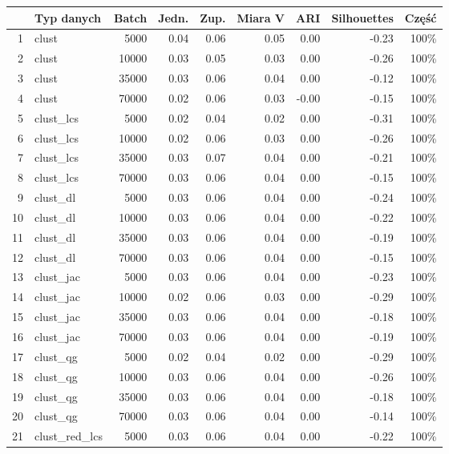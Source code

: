 \documentclass{praca1}
\begin{document}
\begin{table}[!h]
\centering
\begin{tabular}{|rlr|rrr|rr|r|}
\hline
  & Typ danych & Batch & Jedn. & Zup. & Miara V & ARI & Silhouettes & Część \\ 
  \hline
1 & clust & 5000 & 0.04 & 0.06 & 0.05 & 0.00 & -0.23 & 100\% \\ 
  2 & clust & 10000 & 0.03 & 0.05 & 0.03 & 0.00 & -0.26 & 100\% \\ 
  3 & clust & 35000 & 0.03 & 0.06 & 0.04 & 0.00 & -0.12 & 100\% \\ 
  4 & clust & 70000 & 0.02 & 0.06 & 0.03 & -0.00 & -0.15 & 100\% \\ 
   \hline
5 & clust\_lcs & 5000 & 0.02 & 0.04 & 0.02 & 0.00 & -0.31 & 100\% \\ 
  6 & clust\_lcs & 10000 & 0.02 & 0.06 & 0.03 & 0.00 & -0.26 & 100\% \\ 
  7 & clust\_lcs & 35000 & 0.03 & 0.07 & 0.04 & 0.00 & -0.21 & 100\% \\ 
  8 & clust\_lcs & 70000 & 0.03 & 0.06 & 0.04 & 0.00 & -0.15 & 100\% \\ 
   \hline
9 & clust\_dl & 5000 & 0.03 & 0.06 & 0.04 & 0.00 & -0.24 & 100\% \\ 
  10 & clust\_dl & 10000 & 0.03 & 0.06 & 0.04 & 0.00 & -0.22 & 100\% \\ 
  11 & clust\_dl & 35000 & 0.03 & 0.06 & 0.04 & 0.00 & -0.19 & 100\% \\ 
  12 & clust\_dl & 70000 & 0.03 & 0.06 & 0.04 & 0.00 & -0.15 & 100\% \\ 
   \hline
13 & clust\_jac & 5000 & 0.03 & 0.06 & 0.04 & 0.00 & -0.23 & 100\% \\ 
  14 & clust\_jac & 10000 & 0.02 & 0.06 & 0.03 & 0.00 & -0.29 & 100\% \\ 
  15 & clust\_jac & 35000 & 0.03 & 0.06 & 0.04 & 0.00 & -0.18 & 100\% \\ 
  16 & clust\_jac & 70000 & 0.03 & 0.06 & 0.04 & 0.00 & -0.19 & 100\% \\ 
   \hline
17 & clust\_qg & 5000 & 0.02 & 0.04 & 0.02 & 0.00 & -0.29 & 100\% \\ 
  18 & clust\_qg & 10000 & 0.03 & 0.06 & 0.04 & 0.00 & -0.26 & 100\% \\ 
  19 & clust\_qg & 35000 & 0.03 & 0.06 & 0.04 & 0.00 & -0.18 & 100\% \\ 
  20 & clust\_qg & 70000 & 0.03 & 0.06 & 0.04 & 0.00 & -0.14 & 100\% \\ 
   \hline
21 & clust\_red\_lcs & 5000 & 0.03 & 0.06 & 0.04 & 0.00 & -0.22 & 100\% \\ 

\end{tabular}
\end{table}
\end{document}
